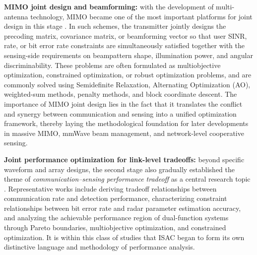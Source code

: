 \begin{itemize}
    \item \textbf{MIMO joint design and beamforming:} with the development of multi-antenna technology, MIMO became one of the most important platforms for joint design in this stage \cite{Liu2020JointRadarComm,Li2023integrated}. In such schemes, the transmitter jointly designs the precoding matrix, covariance matrix, or beamforming vector so that user SINR, rate, or bit error rate constraints are simultaneously satisfied together with the sensing-side requirements on beampattern shape, illumination power, and angular discriminability. These problems are often formulated as multiobjective optimization, constrained optimization, or robust optimization problems, and are commonly solved using Semidefinite Relaxation, Alternating Optimization (AO), weighted-sum methods, penalty methods, and block coordinate descent. The importance of MIMO joint design lies in the fact that it translates the conflict and synergy between communication and sensing into a unified optimization framework, thereby laying the methodological foundation for later developments in massive MIMO, mmWave beam management, and network-level cooperative sensing.
   
    \begin{sloppypar}
    \item \textbf{Joint performance optimization for link-level tradeoffs:} beyond specific waveform and array designs, the second stage also gradually established the theme of \emph{communication--sensing performance tradeoff} as a central research topic \cite{Liu2020JointRadarComm,Liu2022ISAC}. Representative works include deriving tradeoff relationships between communication rate and detection performance, characterizing constraint relationships between bit error rate and radar parameter estimation accuracy, and analyzing the achievable performance region of dual-function systems through Pareto boundaries, multiobjective optimization, and constrained optimization. It is within this class of studies that ISAC began to form its own distinctive language and methodology of performance analysis.
    \end{sloppypar}
\end{itemize}

